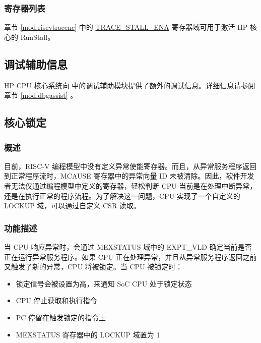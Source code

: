 \documentclass[main\_\_CN.tex]{subfiles}
\begin{document}
\subsubsection{寄存器列表}
\label{sec:riscvcpu-custom-runstall-reg-summ}

章节 \ref{mod:riscvtracenc} \textit{} 中的 \hyperref[fielddesc:TRACESTALLENA]{TRACE\_STALL\_ENA} 寄存器域可用于激活 HP 核心的 RunStall。


\newpage
\subsection{调试辅助信息}
\label{sec:riscvcpu-dbgassist-features}
HP CPU 核心系统向 \chipname{} 中的调试辅助模块提供了额外的调试信息。详细信息请参阅章节 \ref{mod:dbgassist} \textit{}。






\subsection{核心锁定}
\label{sec:riscvcpu-custom-lockup-features}
\subsubsection{概述}
\label{sec:riscvcpu-custom-lockup-overview}
目前，RISC-V 编程模型中没有定义异常使能寄存器。而且，从异常服务程序返回到正常程序流时，MCAUSE 寄存器中的异常向量 ID 未被清除。因此，软件开发者无法仅通过编程模型中定义的寄存器，轻松判断 CPU 当前是在处理中断异常，还是在执行正常的程序流程。为了解决这一问题，CPU 实现了一个自定义的 LOCKUP 域，可以通过自定义 CSR 读取。

\subsubsection{功能描述}
\label{sec:riscvcpu-custom-lockup-feature-func-descr}
当 CPU 响应异常时，会通过 MEXSTATUS 域中的 EXPT\_VLD 确定当前是否正在运行异常服务程序。如果 CPU 正在处理异常，并且从异常服务程序返回之前又触发了新的异常，CPU 将被锁定。当 CPU 被锁定时：

\begin{itemize}
    \item 锁定信号会被设置为高，来通知 SoC CPU 处于锁定状态
    \item CPU 停止获取和执行指令
    \item PC 停留在触发锁定的指令上
    \item MEXSTATUS 寄存器中的 LOCKUP 域置为 1
\end{itemize}
\end{document}
